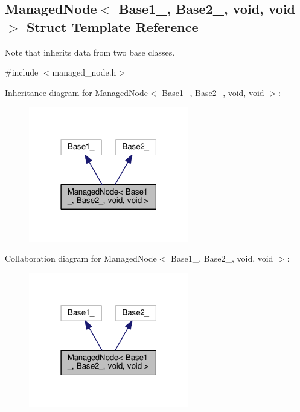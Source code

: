 \hypertarget{structManagedNode_3_01Base1___00_01Base2___00_01void_00_01void_01_4}{}\subsection{Managed\+Node$<$ Base1\+\_\+, Base2\+\_\+, void, void $>$ Struct Template Reference}
\label{structManagedNode_3_01Base1___00_01Base2___00_01void_00_01void_01_4}


Note that inherits data from two base classes.  




{\ttfamily \#include $<$managed\+\_\+node.\+h$>$}



Inheritance diagram for Managed\+Node$<$ Base1\+\_\+, Base2\+\_\+, void, void $>$\+:\nopagebreak
\begin{figure}[H]
\begin{center}
\leavevmode
\includegraphics[width=198pt]{structManagedNode_3_01Base1___00_01Base2___00_01void_00_01void_01_4__inherit__graph}
\end{center}
\end{figure}


Collaboration diagram for Managed\+Node$<$ Base1\+\_\+, Base2\+\_\+, void, void $>$\+:\nopagebreak
\begin{figure}[H]
\begin{center}
\leavevmode
\includegraphics[width=198pt]{structManagedNode_3_01Base1___00_01Base2___00_01void_00_01void_01_4__coll__graph}
\end{center}
\end{figure}
